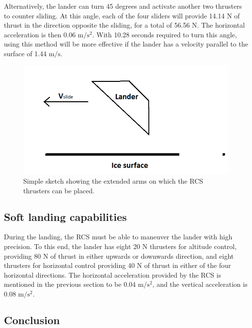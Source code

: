 Alternatively, the lander can turn 45 degrees and activate another two thrusters to counter sliding. At this angle, each of the four sliders will provide 14.14 N of thrust in the direction opposite the sliding, for a total of 56.56 N. The horizontal acceleration is then 0.06 $\mathrm{m/s^2}$. With 10.28 seconds required to turn this angle, using this method will be more effective if the lander has a velocity parallel to the surface of 1.44 $\mathrm{m/s}$.

\begin{figure}[htb]
\begin{center}
\includegraphics[scale=0.8]{figures/RCS/Lunar_slide_angle}
\caption{Simple sketch showing the extended arms on which the RCS thrusters can be placed.}
\label{fig:lunar_slide_angle}
\end{center}
\end{figure}


\subsection{Soft landing capabilities}

During the landing, the RCS must be able to maneuver the lander with high precision. To this end, the lander has eight 20 N thrusters for altitude control, providing 80 N of thrust in either upwards or downwards direction, and eight thrusters for horizontal control providing 40 N of thrust in either of the four horizontal directions. The horizontal acceleration provided by the RCS is mentioned in the previous section to be 0.04 $\mathrm{m/s^2}$, and the vertical acceleration is 0.08 $\mathrm{m/s^2}$.

\subsection{Conclusion}

